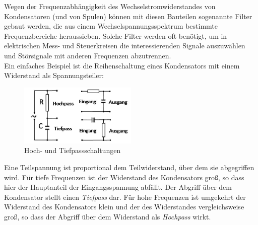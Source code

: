 Wegen der Frequenzabhängigkeit des Wechselstromwiderstandes von Kondensatoren (und von Spulen) können mit diesen Bauteilen sogenannte Filter gebaut werden, die aus einem Wechselspannungsspektrum bestimmte Frequenzbereiche heraussieben. Solche Filter werden oft benötigt, um in elektrischen Mess- und Steuerkreisen die interessierenden Signale auszuwählen und Störsignale mit anderen Frequenzen abzutrennen. \\
Ein einfaches Beispiel ist die Reihenschaltung eines Kondensators mit einem Widerstand als Spannungsteiler:
\begin{figure}[ht]
	\centering
		\includegraphics[width=0.5\textwidth]{Abbildungen/Paesse_gross.jpg}
	\caption{Hoch- und Tiefpassschaltungen}
	\label{fig:Hoch-Tiefpass}
\end{figure}
Eine Teilspannung ist proportional dem Teilwiderstand, über dem sie abgegriffen wird. Für tiefe Frequenzen ist der Widerstand des Kondensators groß, so dass hier der Hauptanteil der Eingangsspannung abfällt. Der Abgriff über dem Kondensator stellt einen \textit{Tiefpass} dar. Für hohe Frequenzen ist umgekehrt der Widerstand des Kondensators klein und der des Widerstandes vergleichsweise groß, so dass der Abgriff über dem Widerstand als \textit{Hochpass} wirkt.

